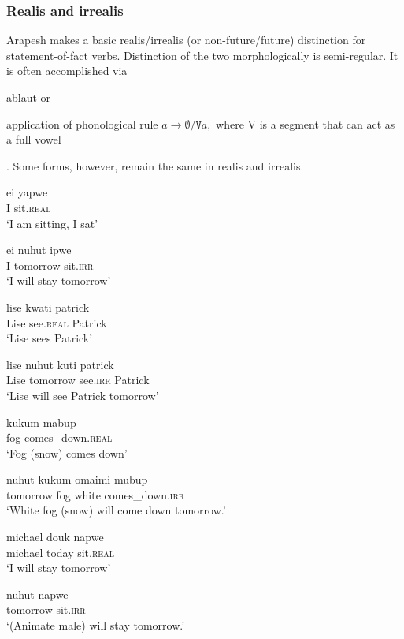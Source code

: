 \documentclass[pdftex,12pt,letterpaper]{article}
\begin{document}
 \subsubsection{Realis and irrealis}

 Arapesh makes a basic realis/irrealis (or non-future/future) distinction for statement-of-fact verbs. Distinction of the two morphologically is semi-regular. It is often accomplished via \begin{inparaenum}[(a)] \item ablaut or \item application of phonological rule $a \rightarrow \emptyset / \texttt{V}a,$ where V is a segment that can act as a full vowel\end{inparaenum}. Some forms, however, remain the same in realis and irrealis.

 \begin{exe}
 \ex
 \gll ei yapwe \\
 I sit.\textsc{real} \\
 \trans `I am sitting, I sat'

 \ex
 \gll ei nuhut ipwe \\
 I tomorrow sit.\textsc{irr} \\
 \trans `I will stay tomorrow'

 \ex
 \gll lise kwati patrick \\
 Lise see.\textsc{real} Patrick \\
 \trans `Lise sees Patrick'

 \ex
 \gll lise nuhut kuti patrick \\
 Lise tomorrow see.\textsc{irr} Patrick \\
 \trans `Lise will see Patrick tomorrow'

 \ex
 \gll kukum mabup \\
 fog comes\_down.\textsc{real} \\
 \trans `Fog (snow) comes down'

 \ex
 \gll nuhut kukum omaimi mubup \\
 tomorrow fog white comes\_down.\textsc{irr} \\
 \trans `White fog (snow) will come down tomorrow.'

 \ex
 \gll michael douk napwe \\
 michael today sit.\textsc{real} \\
 \trans `I will stay tomorrow'

 \ex
 \gll nuhut napwe \\
 tomorrow sit.\textsc{irr} \\
 \trans `(Animate male) will stay tomorrow.'
 \end{exe}
\end{document}
